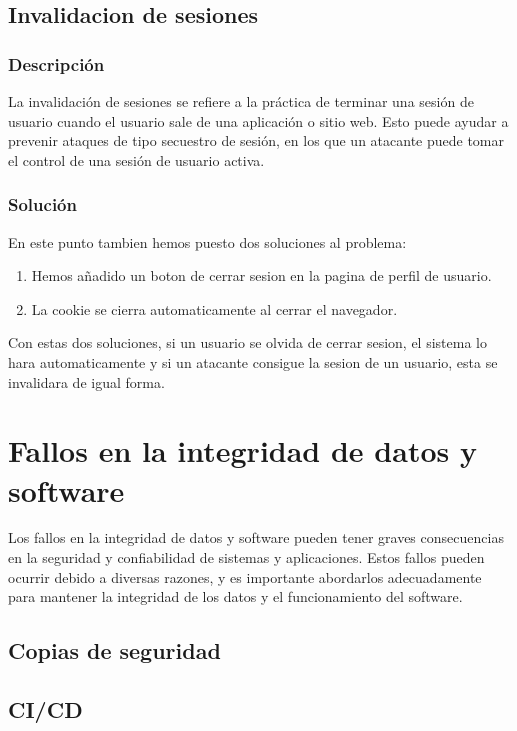 \documentclass{report}
\begin{document}
            \subsection{Invalidacion de sesiones}
                    \subsubsection{Descripción}
                        La invalidación de sesiones se refiere a la práctica de terminar una sesión de usuario cuando el usuario sale de una aplicación o sitio web. Esto puede ayudar a prevenir ataques de tipo secuestro de sesión, en los que un atacante puede tomar el control de una sesión de usuario activa.
                    \subsubsection{Solución}
                        En este punto tambien hemos puesto dos soluciones al problema:
                        \begin{enumerate}
                            \item Hemos añadido un boton de cerrar sesion en la pagina de perfil de usuario.
                            \item La cookie se cierra automaticamente al cerrar el navegador.
                        \end{enumerate}
                        Con estas dos soluciones, si un usuario se olvida de cerrar sesion, el sistema lo hara automaticamente y si un atacante consigue la sesion de un usuario, esta se invalidara de igual forma.
            \clearpage
        \section{Fallos en la integridad de datos y software}
            Los fallos en la integridad de datos y software pueden tener graves consecuencias en la seguridad y confiabilidad de sistemas y aplicaciones. Estos fallos pueden ocurrir debido a diversas razones, y es importante abordarlos adecuadamente para mantener la integridad de los datos y el funcionamiento del software.
            \subsection{Copias de seguridad}
            \clearpage
            \subsection{CI/CD}
\end{document}
